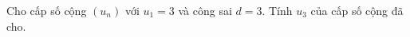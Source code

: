 \begin{ex}
Cho cấp số cộng $(u_n)$ với $u_1=3$ và công sai $d=3$. Tính $u_3$ của cấp số cộng đã cho.
\end{ex}
